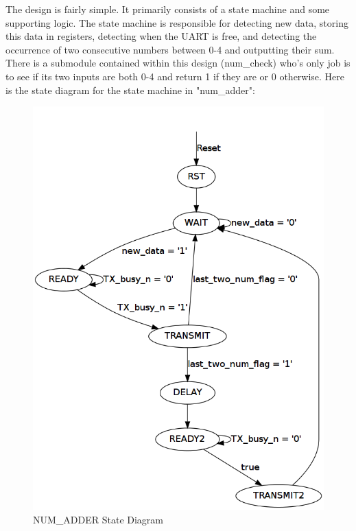 \documentclass{article}
\begin{document}
The design is fairly simple. It primarily consists of a state machine and some supporting logic. The state machine is responsible for detecting new data, storing this data in registers, detecting when the UART is free, and detecting the occurrence of two consecutive numbers between 0-4 and outputting their sum. There is a submodule contained within this design (num\_check) who's only job is to see if its two inputs are both 0-4 and return 1 if they are or 0 otherwise. Here is the state diagram for the state machine in "num\_adder": \\

	\begin{figure}[h]
		\begin{center}
			\includegraphics[scale=0.25]{../dot/Part-6_state_machine.png}
			\caption{NUM\_ADDER State Diagram}
		\end{center}
	\end{figure}
\end{document}
